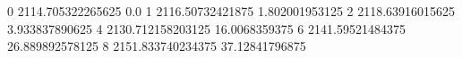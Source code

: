 0 2114.705322265625 0.0
1 2116.50732421875 1.802001953125
2 2118.63916015625 3.933837890625
4 2130.712158203125 16.0068359375
6 2141.59521484375 26.889892578125
8 2151.833740234375 37.12841796875
